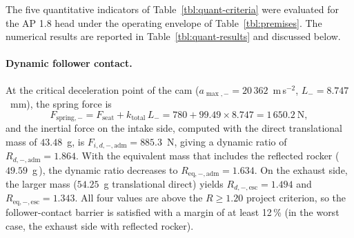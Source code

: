 The five quantitative indicators of Table~\ref{tbl:quant-criteria} were
evaluated for the AP 1.8 head under the operating envelope of
Table~\ref{tbl:premises}. The numerical results are reported in
Table~\ref{tbl:quant-results} and discussed below.

\paragraph{Dynamic follower contact.}
At the critical deceleration point of the cam ($a_{\max,-}=20\,362$~m\,s$^{-2}$,
$L_{-}=8.747$~mm), the spring force is
\begin{equation}
F_{\mathrm{spring},-}=F_{\mathrm{seat}}+k_{\mathrm{total}}\,L_{-}=780+99.49\times 8.747=1\,650.2~\mathrm{N},
\label{eq:Fspring}
\end{equation}
and the inertial force on the intake side, computed with the direct
translational mass of $43.48$~g, is
$F_{i,d,-,\mathrm{adm}}=885.3$~N, giving a dynamic ratio of
$R_{d,-,\mathrm{adm}}=1.864$. With the equivalent mass that includes
the reflected rocker (\,$49.59$~g\,), the dynamic ratio decreases to
$R_{\mathrm{eq},-,\mathrm{adm}}=1.634$. On the exhaust side, the larger
mass ($54.25$~g translational direct) yields
$R_{d,-,\mathrm{esc}}=1.494$ and $R_{\mathrm{eq},-,\mathrm{esc}}=1.343$.
All four values are above the $R\geq 1.20$ project criterion, so the
follower-contact barrier is satisfied with a margin of at least
12\,\% (in the worst case, the exhaust side with reflected rocker).

